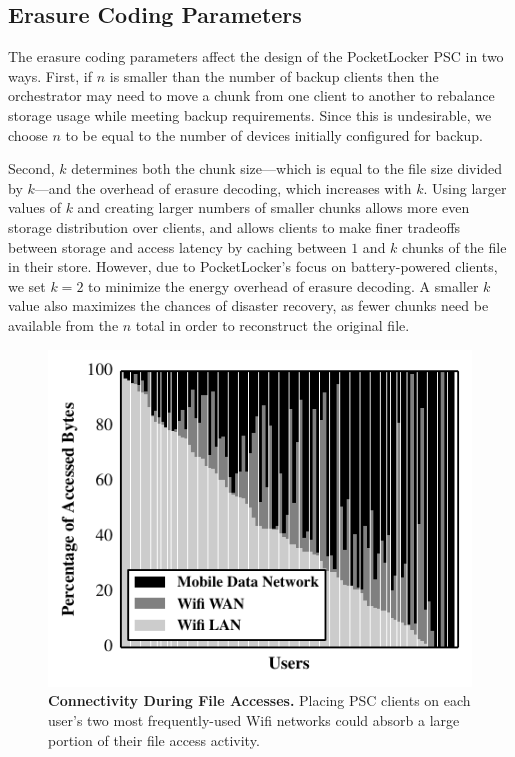 \subsection{Erasure Coding Parameters}

The erasure coding parameters affect the design of the PocketLocker PSC in
two ways. First, if $n$ is smaller than the number of backup clients then the
orchestrator may need to move a chunk from one client to another to rebalance
storage usage while meeting backup requirements. Since this is undesirable,
we choose $n$ to be equal to the number of devices initially configured for
backup.

Second, $k$ determines both the chunk size---which is equal to the file size
divided by $k$---and the overhead of erasure decoding, which increases with
$k$. Using larger values of $k$ and creating larger numbers of smaller chunks
allows more even storage distribution over clients, and allows clients to
make finer tradeoffs between storage and access latency by
caching between $1$ and $k$ chunks of the file in their store. However,
due to PocketLocker's focus on battery-powered clients, we set $k
= 2$ to minimize the energy overhead of erasure decoding. A smaller $k$ value
also maximizes the chances of disaster recovery, as fewer chunks need be
available from the $n$ total in order to reconstruct the original file.

\begin{figure}[t]

  \includegraphics{./figures/pocketlocker/ConnectivityPercentageGraph.pdf}

  \caption{\small \textbf{Connectivity During File Accesses.} Placing PSC
    clients on each user's two most frequently-used Wifi networks could absorb a
  large portion of their file access activity.}

  \label{fig-simulation-connectivity}
  
  \vspace*{-0.2in}
\end{figure}
